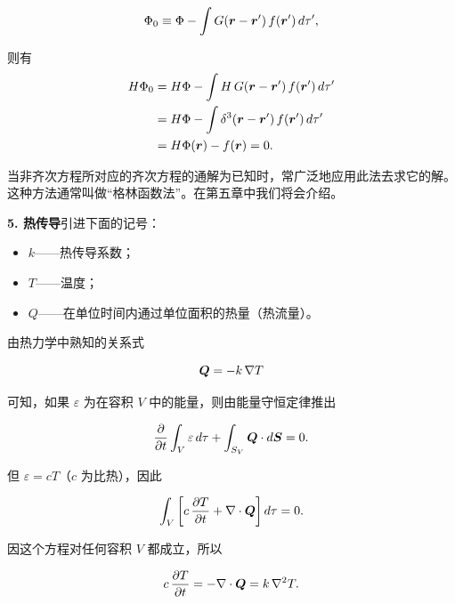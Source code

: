 \begin{equation*}
\Phi_0 \equiv \Phi - \int G(\bm{r} - \bm{r}')\, f(\bm{r}')\, d\tau',
\end{equation*}

则有
\begin{equation*}
\begin{aligned}
H\Phi_0 &= H\Phi - \int H\, G(\bm{r} - \bm{r}')\, f(\bm{r}')\, d\tau'\\
&= H\Phi - \int \delta^{3}(\bm{r} - \bm{r}')\, f(\bm{r}')\, d\tau'\\
&= H\Phi(\bm{r}) - f(\bm{r}) = 0.
\end{aligned}
\end{equation*}

当非齐次方程所对应的齐次方程的通解为已知时，常广泛地应用此法去求它的解。这种方法通常叫做“格林函数法”。在第五章中我们将会介绍。

\textbf{5. 热传导}\quad 引进下面的记号：

\begin{itemize}[leftmargin=2.5em,itemsep=1pt]
\item $k$——热传导系数；
\item $T$——温度；
\item $Q$——在单位时间内通过单位面积的热量（热流量）。
\end{itemize}

由热力学中熟知的关系式

\begin{equation*}
\bm{Q} = -k\, \nabla T
\end{equation*}

可知，如果 $\varepsilon$ 为在容积 $V$ 中的能量，则由能量守恒定律推出

\begin{equation*}
\frac{\partial}{\partial t} \int_{V} \varepsilon\, d\tau + \int_{S_V} \bm{Q} \cdot d\bm{S} = 0.
\end{equation*}

但 $\varepsilon = cT$（$c$ 为比热），因此

\begin{equation*}
\int_{V} \left[c\, \frac{\partial T}{\partial t} + \nabla \cdot \bm{Q}\right] d\tau = 0.
\end{equation*}

因这个方程对任何容积 $V$ 都成立，所以

\begin{equation*}
c\, \frac{\partial T}{\partial t} = -\nabla \cdot \bm{Q} = k\, \nabla^{2} T.
\end{equation*}

